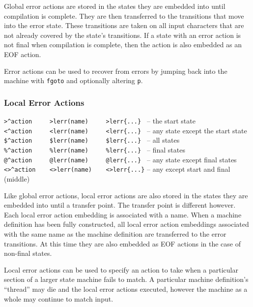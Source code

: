 \documentclass[letterpaper,11pt,oneside]{book}
\begin{document}
Global error actions are stored in the states they are embedded into until
compilation is complete. They are then transferred to the transitions that move
into the error state. These transitions are taken on all input characters that
are not already covered by the state's transitions. If a state with an error
action is not final when compilation is complete, then the action is also
embedded as an EOF action.

Error actions can be used to recover from errors by jumping back into the
machine with \verb|fgoto| and optionally altering \verb|p|.

\subsubsection{Local Error Actions}

\noindent\hspace*{24pt}\verb|>^action     >lerr(name)     >lerr{...} | -- the start state\\
\noindent\hspace*{24pt}\verb|<^action     <lerr(name)     <lerr{...} | -- any state except the start state\\
\noindent\hspace*{24pt}\verb|$^action     $lerr(name)     $lerr{...} | -- all states\\
\noindent\hspace*{24pt}\verb|%^action     %lerr(name)     %lerr{...} | -- final states\\
\noindent\hspace*{24pt}\verb|@^action     @lerr(name)     @lerr{...} | -- any state except final states\\
\noindent\hspace*{24pt}\verb|<>^action    <>lerr(name)    <>lerr{...}| -- any except start and final (middle)
\vspace{12pt}

Like global error actions, local error actions are also stored in the states
they are embedded into until a transfer point. The transfer point is different
however. Each local error action embedding is associated with a name. When a
machine definition has been fully constructed, all local error action
embeddings associated with the same name as the machine definition are
transferred to the error transitions. At this time they are also embedded as
EOF actions in the case of non-final states.

Local error actions can be used to specify an action to take when a particular
section of a larger state machine fails to match. A particular machine
definition's ``thread'' may die and the local error actions executed, however
the machine as a whole may continue to match input.
\end{document}
